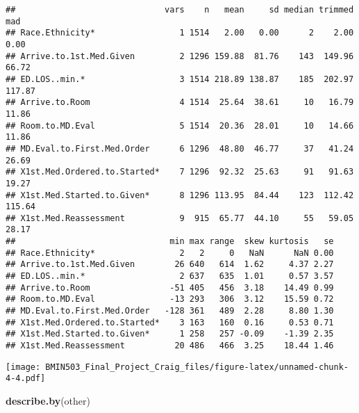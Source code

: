 \documentclass[]{article}
\newenvironment{Shaded}{\begin{snugshade}}{\end{snugshade}}
\newcommand{\KeywordTok}[1]{\textcolor[rgb]{0.13,0.29,0.53}{\textbf{#1}}}
\newcommand{\OperatorTok}[1]{\textcolor[rgb]{0.81,0.36,0.00}{\textbf{#1}}}
\newcommand{\NormalTok}[1]{#1}
\begin{document}
\begin{verbatim}
##                              vars    n   mean     sd median trimmed    mad
## Race.Ethnicity*                 1 1514   2.00   0.00      2    2.00   0.00
## Arrive.to.1st.Med.Given         2 1296 159.88  81.76    143  149.96  66.72
## ED.LOS..min.*                   3 1514 218.89 138.87    185  202.97 117.87
## Arrive.to.Room                  4 1514  25.64  38.61     10   16.79  11.86
## Room.to.MD.Eval                 5 1514  20.36  28.01     10   14.66  11.86
## MD.Eval.to.First.Med.Order      6 1296  48.80  46.77     37   41.24  26.69
## X1st.Med.Ordered.to.Started*    7 1296  92.32  25.63     91   91.63  19.27
## X1st.Med.Started.to.Given*      8 1296 113.95  84.44    123  112.42 115.64
## X1st.Med.Reassessment           9  915  65.77  44.10     55   59.05  28.17
##                               min max range  skew kurtosis   se
## Race.Ethnicity*                 2   2     0   NaN      NaN 0.00
## Arrive.to.1st.Med.Given        26 640   614  1.62     4.37 2.27
## ED.LOS..min.*                   2 637   635  1.01     0.57 3.57
## Arrive.to.Room                -51 405   456  3.18    14.49 0.99
## Room.to.MD.Eval               -13 293   306  3.12    15.59 0.72
## MD.Eval.to.First.Med.Order   -128 361   489  2.28     8.80 1.30
## X1st.Med.Ordered.to.Started*    3 163   160  0.16     0.53 0.71
## X1st.Med.Started.to.Given*      1 258   257 -0.09    -1.39 2.35
## X1st.Med.Reassessment          20 486   466  3.25    18.44 1.46
\end{verbatim}

\begin{Shaded}
\end{Shaded}

\texttt{[image: BMIN503\_Final\_Project\_Craig\_files/figure-latex/unnamed-chunk-4-4.pdf]}

\begin{Shaded}
\begin{Highlighting}[]
\KeywordTok{describe.by}\NormalTok{(other)}
\end{Highlighting}
\end{Shaded}
\end{document}
